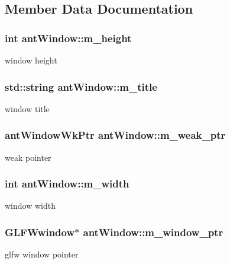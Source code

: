\subsection{Member Data Documentation}
\hypertarget{classant_window_a81b5d1fc4f545fbf76fa63d0292494b8}{
\subsubsection[{m\+\_\+height}]{\setlength{\rightskip}{0pt plus 5cm}int ant\+Window\+::m\+\_\+height\hspace{0.3cm}{\ttfamily [private]}}}\label{classant_window_a81b5d1fc4f545fbf76fa63d0292494b8}
window height \hypertarget{classant_window_a6799e6207a4367630aa5a7a0603bafbb}{
\subsubsection[{m\+\_\+title}]{\setlength{\rightskip}{0pt plus 5cm}std\+::string ant\+Window\+::m\+\_\+title\hspace{0.3cm}{\ttfamily [private]}}}\label{classant_window_a6799e6207a4367630aa5a7a0603bafbb}
window title \hypertarget{classant_window_a44da6525e4278681d0563347ca970bbc}{
\subsubsection[{m\+\_\+weak\+\_\+ptr}]{\setlength{\rightskip}{0pt plus 5cm}ant\+Window\+Wk\+Ptr ant\+Window\+::m\+\_\+weak\+\_\+ptr\hspace{0.3cm}{\ttfamily [private]}}}\label{classant_window_a44da6525e4278681d0563347ca970bbc}
weak pointer \hypertarget{classant_window_ae50857682369f77c9fab71c64d3d8299}{
\subsubsection[{m\+\_\+width}]{\setlength{\rightskip}{0pt plus 5cm}int ant\+Window\+::m\+\_\+width\hspace{0.3cm}{\ttfamily [private]}}}\label{classant_window_ae50857682369f77c9fab71c64d3d8299}
window width \hypertarget{classant_window_a8b77985c8b4772027e1cbed42ce67daf}{
\subsubsection[{m\+\_\+window\+\_\+ptr}]{\setlength{\rightskip}{0pt plus 5cm}G\+L\+F\+Wwindow$\ast$ ant\+Window\+::m\+\_\+window\+\_\+ptr\hspace{0.3cm}{\ttfamily [private]}}}\label{classant_window_a8b77985c8b4772027e1cbed42ce67daf}
glfw window pointer 

